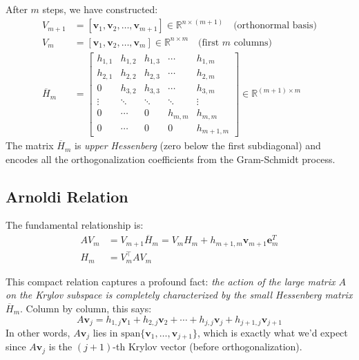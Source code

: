 \documentclass[../../main.tex]{subfiles}
\begin{document}
After $m$ steps, we have constructed:
\begin{align}
  V_{m+1}        & = [\mathbf{v}_1, \mathbf{v}_2, \ldots, \mathbf{v}_{m+1}] \in \mathbb{R}^{n \times (m+1)} \quad \text{(orthonormal basis)} \\
  V_m            & = [\mathbf{v}_1, \mathbf{v}_2, \ldots, \mathbf{v}_m] \in \mathbb{R}^{n \times m} \quad \text{(first $m$ columns)}         \\
  \overline{H}_m & = \begin{bmatrix}
                       h_{1,1} & h_{1,2} & h_{1,3} & \cdots  & h_{1,m}   \\
                       h_{2,1} & h_{2,2} & h_{2,3} & \cdots  & h_{2,m}   \\
                       0       & h_{3,2} & h_{3,3} & \cdots  & h_{3,m}   \\
                       \vdots  & \ddots  & \ddots  & \ddots  & \vdots    \\
                       0       & \cdots  & 0       & h_{m,m} & h_{m,m}   \\
                       0       & \cdots  & 0       & 0       & h_{m+1,m}
                     \end{bmatrix} \in \mathbb{R}^{(m+1) \times m}
\end{align}
The matrix $\overline{H}_m$ is \emph{upper Hessenberg} (zero below the first subdiagonal) and encodes all the orthogonalization coefficients from the Gram-Schmidt process.

\subsection{Arnoldi Relation}
The fundamental relationship is:
\begin{align*}\label{eq:arnoldi-relation}
  AV_m & = V_{m+1}\overline{H}_m = V_m H_m + h_{m+1,m}\mathbf{v}_{m+1}\mathbf{e}_m^T \\
  H_m  & = V_m^\top A V_m
\end{align*}

This compact relation captures a profound fact: \emph{the action of the large matrix $A$ on the Krylov subspace is completely characterized by the small Hessenberg matrix $\overline{H}_m$}.
Column by column, this says:
\[
  A\mathbf{v}_j = h_{1,j}\mathbf{v}_1 + h_{2,j}\mathbf{v}_2 + \cdots + h_{j,j}\mathbf{v}_j + h_{j+1,j}\mathbf{v}_{j+1}
\]
In other words, $A\mathbf{v}_j$ lies in $\text{span}\{\mathbf{v}_1, \ldots, \mathbf{v}_{j+1}\}$, which is exactly what we'd expect since $A\mathbf{v}_j$ is the $(j+1)$-th Krylov vector (before orthogonalization).
\end{document}
